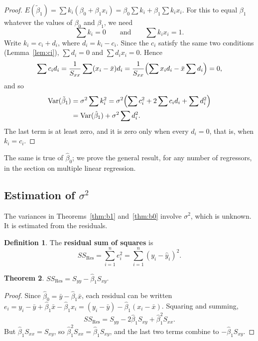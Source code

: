 \documentclass[11pt,a4paper]{article}
\numberwithin{equation}{section}
\theoremstyle{definition}
\newtheorem{thm}{Theorem}[subsection]
\newtheorem{defn}[thm]{Definition}
\begin{document}
\begin{proof}
$E(\tilde\beta_1) = \sum k_i(\beta_0 + \beta_1 x_i) = \beta_0 \sum k_i + \beta_1 \sum k_i x_i$.
For this to equal $\beta_1$ whatever the values of $\beta_0$ and $\beta_1$, we need
\[
\sum k_i = 0 \qquad\text{and}\qquad \sum k_i x_i = 1 .
\]
Write $k_i = c_i + d_i$, where $d_i = k_i - c_i$. Since the $c_i$ satisfy the same two
conditions (Lemma~\ref{lem:ci}), $\sum d_i = 0$ and $\sum d_i x_i = 0$. Hence
\[
\sum c_i d_i = \frac{1}{S_{xx}} \sum (x_i - \bar x) d_i
= \frac{1}{S_{xx}} \Bigl( \sum x_i d_i - \bar x \sum d_i \Bigr) = 0 ,
\]
and so
\begin{align*}
\operatorname{Var}(\tilde\beta_1) &= \sigma^2 \sum k_i^2
  = \sigma^2 \Bigl( \sum c_i^2 + 2 \sum c_i d_i + \sum d_i^2 \Bigr) \\
  &= \operatorname{Var}(\hat\beta_1) + \sigma^2 \sum d_i^2 .
\end{align*}
The last term is at least zero, and it is zero only when every $d_i = 0$, that is, when
$k_i = c_i$.
\end{proof}

The same is true of $\hat\beta_0$; we prove the general result, for any number of regressors,
in the section on multiple linear regression.

\subsection{Estimation of $\sigma^2$}
The variances in Theorems~\ref{thm:b1} and~\ref{thm:b0} involve $\sigma^2$, which is
unknown. It is estimated from the residuals.

\begin{defn}
The \textbf{residual sum of squares} is
\[
SS_{\mathrm{Res}} = \sum_{i=1}^n e_i^2 = \sum_{i=1}^n (y_i - \hat y_i)^2 .
\]
\end{defn}

\begin{thm}\label{thm:ssres}
$SS_{\mathrm{Res}} = S_{yy} - \hat\beta_1 S_{xy}$.
\end{thm}

\begin{proof}
Since $\hat\beta_0 = \bar y - \hat\beta_1 \bar x$, each residual can be written
$e_i = y_i - \bar y + \hat\beta_1 \bar x - \hat\beta_1 x_i = (y_i - \bar y) - \hat\beta_1 (x_i - \bar x)$.
Squaring and summing,
\[
SS_{\mathrm{Res}} = S_{yy} - 2\hat\beta_1 S_{xy} + \hat\beta_1^2 S_{xx} .
\]
But $\hat\beta_1 S_{xx} = S_{xy}$, so $\hat\beta_1^2 S_{xx} = \hat\beta_1 S_{xy}$, and the
last two terms combine to $-\hat\beta_1 S_{xy}$.
\end{proof}
\end{document}

